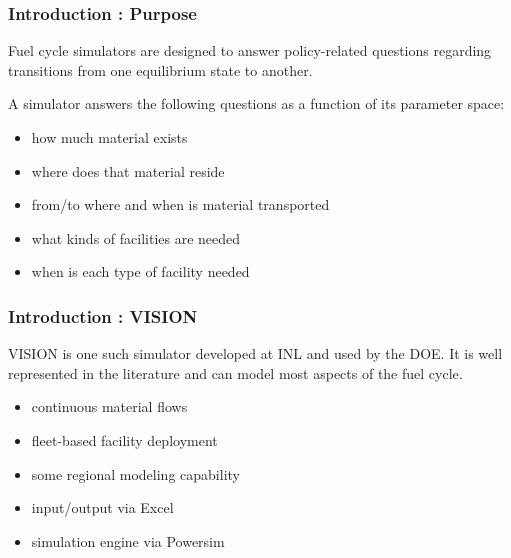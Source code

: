 
\begin{frame}[ctb!]
  \frametitle{Introduction : Purpose}
  Fuel cycle simulators are designed to answer policy-related questions
  regarding transitions from one equilibrium state to another.

  \vspace{0.2cm}

  \pause
  A simulator answers the following questions as a function of its 
  parameter space:
  \begin{itemize}
    \item how much material exists
    \item where does that material reside
    \item from/to where and when is material transported
    \item what kinds of facilities are needed
    \item when is each type of facility needed
  \end{itemize}
\end{frame}

\begin{frame}[ctb!]
  \frametitle{Introduction : VISION}
  VISION is one such simulator developed at INL and used by the DOE. 
  It is well represented in the literature and can model most aspects 
  of the fuel cycle. \cite{yacout_vision_2006}
  \begin{itemize}
    \item continuous material flows
    \item fleet-based facility deployment
    \item some regional modeling capability
    \item input/output via Excel
    \item simulation engine via Powersim
  \end{itemize}
\end{frame}
